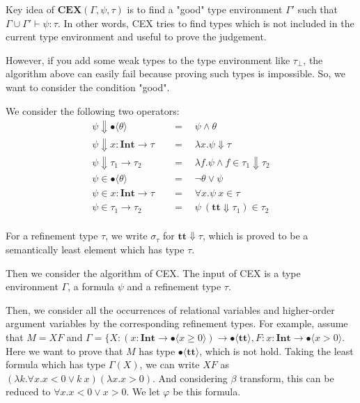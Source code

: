 \documentclass[runningheads]{llncs}
\newcommand \true {\textbf{tt}}
\newcommand \stypeint {\textbf{Int}}
\newcommand \stypebool {\bullet}
\newcommand \constraint {\theta}
\newcommand \typeint[1]{{#1} : \stypeint}
\newcommand \typebool[1]{\stypebool \langle #1 \rangle}
\begin{document}
Key idea of \(\textbf{CEX}(\Gamma, \psi, \tau) \) is to find a "good" type
environment \(\Gamma' \) such that \(\Gamma \cup \Gamma' \vdash \psi: \tau \).
In other words, CEX tries to find types which is not included in the current
type environment and useful to prove the judgement.

However, if you add some weak types to the type environment like \(\tau_\bot\),
the algorithm above can easily fail because proving such types is impossible.
So, we want to consider the condition "good".

We consider the following two operators:
\begin{align*}
    \psi \Downarrow \typebool{\constraint} \quad
        &= \quad \psi \land \constraint
        \\
    \psi \Downarrow \typeint{x} \to \tau   \quad
        &= \quad \lambda x. \psi \Downarrow \tau
        \\
    \psi \Downarrow \tau_1 \to \tau_2 \quad
        &= \quad \lambda f. \psi \land f \in \tau_1 \Downarrow \tau_2
        \\
    \psi \in \typebool{\constraint} \quad
        &= \quad \lnot \theta \lor \psi
        \\
    \psi \in \typeint{x} \to \tau   \quad
        &= \quad \forall x. \psi\ x \in \tau
        \\
    \psi \in \tau_1 \to \tau_2 \quad
        &= \quad \psi\ (\true \Downarrow \tau_1) \in \tau_2
        \\
\end{align*}

For a refinement type \( \tau \),
we write \( \sigma_\tau \) for \( \true \Downarrow \tau \),
which is proved to be a semantically least element which has
type \( \tau \).

Then we consider the algorithm of CEX.
The input of CEX is a type environment \( \Gamma \), a formula \( \psi \)
and a refinement type \( \tau \).

Then, we consider all the occurrences of relational variables and higher-order
argument variables by the corresponding refinement types.
For example, assume that \(M = X F \) and
\( \Gamma = \{ X: (\typeint{x} \rightarrow \typebool{x \geq 0}) \rightarrow
\typebool{\true}, F: \typeint{x} \rightarrow \typebool{x > 0 } \).
Here we want to prove that \( M \) has type \( \typebool{\true} \), which is
not hold.
Taking the least formula which has type \( \Gamma(X) \), we can write \( X F \)
as
\( (\lambda k. \forall x. x < 0 \lor k\ x)
(\lambda x. x > 0) \).
And considering \( \beta \) transform, this can be reduced to
\( \forall x. x < 0 \lor x > 0 \). We let \( \varphi \) be this formula.
\end{document}
